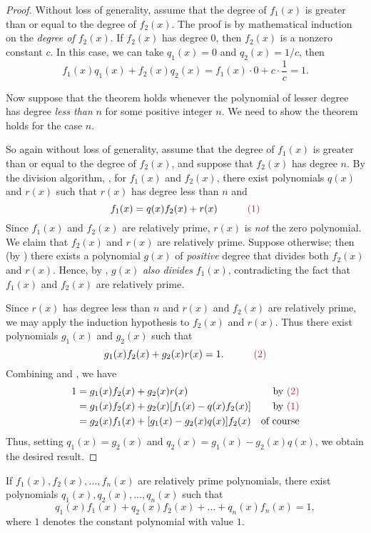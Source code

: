 \begin{proof}
Without loss of generality, assume that the degree of \(f_1(x)\) is greater than or equal to the degree of \(f_2(x)\).
The proof is by mathematical induction on the \emph{degree of \(f_2(x)\)}.
If \(f_2(x)\) has degree \(0\), then \(f_2(x)\) is a nonzero constant \(c\).
In this case, we can take \(q_1(x) = 0\) and \(q_2(x) = 1/c\), then
\[
    f_1(x) q_1(x) + f_2(x) q_2(x) = f_1(x) \cdot 0 + c \cdot \frac{1}{c} = 1.
\]

Now suppose that the theorem holds whenever the polynomial of lesser degree has degree \emph{less than} \(n\) for some positive integer \(n\).
We need to show the theorem holds for the case \(n\).

So again without loss of generality, assume that the degree of \(f_1(x)\) is greater than or equal to the degree of \(f_2(x)\),
and suppose that \(f_2(x)\) has degree \(n\).
By the division algorithm, , for \(f_1(x)\) and \(f_2(x)\), there exist polynomials \(q(x)\) and \(r(x)\) such that \(r(x)\) has degree less than \(n\) and
\[
    f_1(x) = q(x)f_2(x) + r(x) \quad \quad \quad \MAROON{(1)}
\]
Since \(f_1(x)\) and \(f_2(x)\) are relatively prime, \(r(x)\) is \emph{not} the zero polynomial.
We claim that \(f_2(x)\) and \(r(x)\) are relatively prime.
Suppose otherwise; then (by ) there exists a polynomial \(g(x)\) of \emph{positive} degree that divides both \(f_2(x)\) and \(r(x)\).
Hence, by , \(g(x)\) \emph{also divides} \(f_1(x)\), contradicting the fact that \(f_1(x)\) and \(f_2(x)\) are relatively prime.

Since \(r(x)\) has degree less than \(n\) and \(r(x)\) and \(f_2(x)\) are relatively prime,
we may apply the induction hypothesis to \(f_2(x)\) and \(r(x)\).
Thus there exist polynomials \(g_1(x)\) and \(g_2(x)\) such that
\[
    g_1(x) f_2(x) + g_2(x) r(x) = 1. \quad \quad \quad \MAROON{(2)}
\]
Combining  and , we have
\begin{align*}
    1 & = g_1(x)f_2(x) + g_2(x)r(x) & \text{by \MAROON{(2)}} \\
      & = g_1(x)f_2(x) + g_2(x)[f_1(x) - q(x)f_2(x)] & \text{by \MAROON{(1)}} \\
      & = g_2(x) f_1(x) + [g_1(x) - g_2(x)q(x)]f_2(x) & \text{of course}
\end{align*}
Thus, setting \(q_1(x) = g_2(x)\) and \(q_2(x) = g_1(x) - g_2(x)q(x)\), we obtain the desired result.
\end{proof}

\begin{appendix theorem} \label{thm e.2}
If \(f_1(x), f_2(x), ..., f_n(x)\) are relatively prime polynomials, there exist polynomials \(q_1(x), q_2(x), ..., q_n(x)\) such that
\[
    q_1(x)f_1(x) + q_2(x)f_2(x) + ... + q_n(x)f_n(x) = 1,
\]
where \(1\) denotes the constant polynomial with value \(1\).
\end{appendix theorem}


